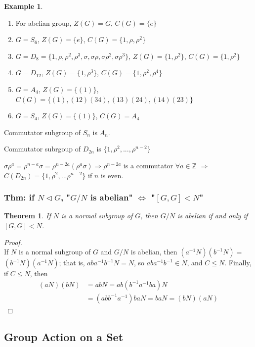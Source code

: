 \documentclass[11pt,a4paper]{article}
\newtheorem{theorem}{Theorem}
\newtheorem{example}{Example}
\begin{document}
\begin{example}
\end{example}
\begin{enumerate}[(1)]
    \item For abelian group, $Z(G)=G$, $C(G)=\{e\}$
    \item $G=S_6$, $Z(G)=\{e\}$, $C(G)=\{1,\rho,\rho^2\}$
    \item $G=D_8=\{1,\rho,\rho^2,\rho^3,\sigma,\sigma\rho,\sigma\rho^2,\sigma\rho^3\}$, $Z(G)=\{1,\rho^2\}$, $C(G)=\{1,\rho^2\}$
    \item $G=D_{12}$, $Z(G)=\{1,\rho^3\}$, $C(G)=\{1,\rho^2,\rho^4\}$
    \item $G=A_4$, $Z(G)=\{(1)\}$, $C(G)=\{(1),(12)(34),(13)(24),(14)(23)\}$
    \item $G=S_4$, $Z(G)=\{(1)\}$, $C(G)=A_4$
\end{enumerate}
Commutator subgroup of $S_n$ is $A_n$.

Commutator subrgoup of $D_{2n}$ is $\{1,\rho^2,...,\rho^{n-2}\}$

$\sigma\rho^{a}=\rho^{n-a}\sigma=\rho^{n-2a}(\rho^{a}\sigma) \Rightarrow \rho^{n-2a}$ is a commutator $\forall a\in \mathbb{Z}$ $\Rightarrow$ $C(D_{2n})=\{1,\rho^2,...\rho^{n-2}\}$ if $n$ is even.

\subsubsection{Thm: if $N \lhd G$, "$G/N$ is abelian" $\Leftrightarrow$ "$[G,G] < N$"}
\begin{theorem}
    If $N$ is a normal subgroup of $G$, then $G/N$ is abelian if and only if $[G,G] < N$.
\end{theorem}
\begin{proof}
\quad\\
If $N$ is a normal subgroup of $G$ and $G / N$ is abelian, then $\left(a^{-1} N\right)\left(b^{-1} N\right)=$ $\left(b^{-1} N\right)\left(a^{-1} N\right)$; that is, $a b a^{-1} b^{-1} N=N$, so $a b a^{-1} b^{-1} \in N$, and $C \leq N$. Finally, if $C \leq N$, then
$$
\begin{aligned}
(a N)(b N) &=a b N=a b\left(b^{-1} a^{-1} b a\right) N \\
&=\left(a b b^{-1} a^{-1}\right) b a N=b a N=(b N)(a N)
\end{aligned}
$$
\end{proof}


\subsection{Group Action on a Set}
\end{document}
